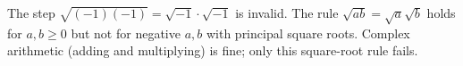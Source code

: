 The step $\sqrt{(-1)(-1)}=\sqrt{-1}\cdot\sqrt{-1}$ is invalid. The rule $\sqrt{ab}=\sqrt a\sqrt b$ holds for $a,b\ge0$ but not for negative $a,b$ with principal square roots. Complex arithmetic (adding and multiplying) is fine; only this square-root rule fails.
